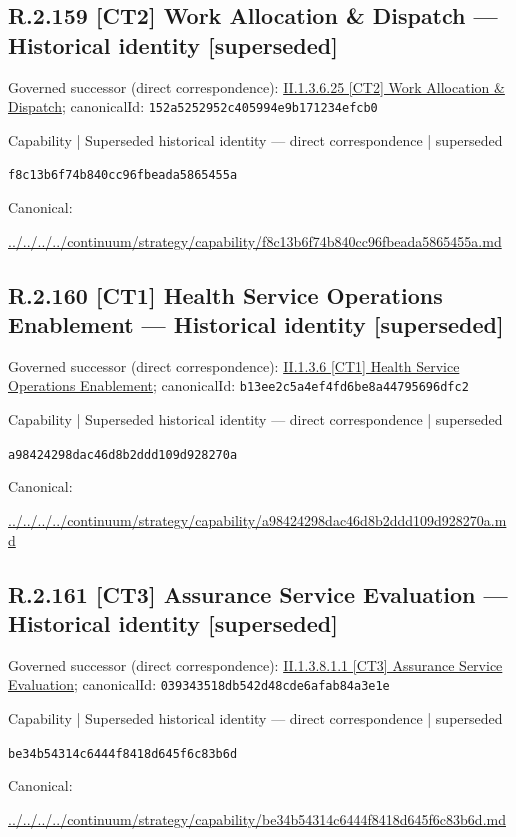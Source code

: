 \documentclass[10pt,a4paper]{article}
\begin{document}
\subsection*{R.2.159 [CT2] Work Allocation \& Dispatch — Historical identity [superseded]}
Governed successor (direct correspondence): \hyperref[element-152a5252952c405994e9b171234efcb0]{II.1.3.6.25 [CT2] Work Allocation \& Dispatch}; canonicalId: \texttt{152a5252952c405994e9b171234efcb0}\par
\label{element-f8c13b6f74b840cc96fbeada5865455a}
{\small Capability | Superseded historical identity — direct correspondence | superseded}\par
\texttt{f8c13b6f74b840cc96fbeada5865455a}\par
Canonical: \par
{\footnotesize\url{../../../../continuum/strategy/capability/f8c13b6f74b840cc96fbeada5865455a.md}}\par
\subsection*{R.2.160 [CT1] Health Service Operations Enablement — Historical identity [superseded]}
Governed successor (direct correspondence): \hyperref[element-b13ee2c5a4ef4fd6be8a44795696dfc2]{II.1.3.6 [CT1] Health Service Operations Enablement}; canonicalId: \texttt{b13ee2c5a4ef4fd6be8a44795696dfc2}\par
\label{element-a98424298dac46d8b2ddd109d928270a}
{\small Capability | Superseded historical identity — direct correspondence | superseded}\par
\texttt{a98424298dac46d8b2ddd109d928270a}\par
Canonical: \par
{\footnotesize\url{../../../../continuum/strategy/capability/a98424298dac46d8b2ddd109d928270a.md}}\par
\subsection*{R.2.161 [CT3] Assurance Service Evaluation — Historical identity [superseded]}
Governed successor (direct correspondence): \hyperref[element-039343518db542d48cde6afab84a3e1e]{II.1.3.8.1.1 [CT3] Assurance Service Evaluation}; canonicalId: \texttt{039343518db542d48cde6afab84a3e1e}\par
\label{element-be34b54314c6444f8418d645f6c83b6d}
{\small Capability | Superseded historical identity — direct correspondence | superseded}\par
\texttt{be34b54314c6444f8418d645f6c83b6d}\par
Canonical: \par
{\footnotesize\url{../../../../continuum/strategy/capability/be34b54314c6444f8418d645f6c83b6d.md}}\par
\end{document}
